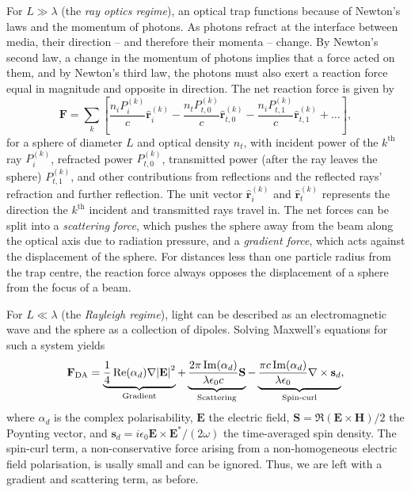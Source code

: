 \documentclass[hyperref={colorlinks=true, urlcolor=blue, citecolor=blue, final, bound}]{sfuthesis}
\begin{document}
For $L \gg \lambda$ (the \textit{ray optics regime}), an optical trap functions because of Newton's laws and the momentum of photons. As photons refract at the interface between media, their direction -- and therefore their momenta -- change. By Newton's second law, a change in the momentum of photons implies that a force acted on them, and by Newton's third law, the photons must also exert a reaction force equal in magnitude and opposite in direction. The net reaction force is given by~\cite{Jones2015}
\begin{equation}
    \mathbf F = \sum_{k} \left[ \frac{n_iP_i^{(k)}}{c}\hat{\mathbf{r}}_i^{(k)} - \frac{n_tP_{t,0}^{(k)}}{c}\hat{\mathbf{r}}_{t,0}^{(k)} - \frac{n_iP_{t,1}^{(k)}}{c}\hat{\mathbf{r}}_{t,1}^{(k)} + \dots\right],
\end{equation}
for a sphere of diameter $L$ and optical density $n_t$, with incident power of the $k^{\mathrm{th}}$ ray $P_i^{(k)}$, refracted power $P_{t,0}^{(k)}$, transmitted power (after the ray leaves the sphere) $P_{t,1}^{(k)}$, and other contributions from reflections and the reflected rays' refraction and further reflection. The unit vector $\hat{\mathbf r}_i^{(k)}$ and $\hat{\mathbf r}_t^{(k)}$ represents the direction the $k^{\mathrm{th}}$ incident and transmitted rays travel in. The net forces can be split into a \textit{scattering force}, which pushes the sphere away from the beam along the optical axis due to radiation pressure, and a \textit{gradient force}, which acts against the displacement of the sphere. For distances less than one particle radius from the trap centre, the reaction force always opposes the displacement of a sphere from the focus of a beam. 

For $L \ll \lambda$ (the \textit{Rayleigh regime}), light can be described as an electromagnetic wave and the sphere as a collection of dipoles. Solving Maxwell's equations for such a system yields~\cite{Jones2015}
\begin{equation}
    \mathbf F_{\mathrm{DA}} = \underbrace{\frac 14 \Re(\alpha_d)\nabla \abs{\mathbf E}^2}_{\text{Gradient}} + \underbrace{\frac{2\pi\Im(\alpha_d)}{\lambda\epsilon_0c}\mathbf S}_{\text{Scattering}} - \underbrace{\frac {\pi c\Im(\alpha_d)}{\lambda\epsilon_0}\nabla\times\mathbf s_d}_{\text{Spin-curl}},
\end{equation}
where $\alpha_d$ is the complex polarisability, $\mathbf E$ the electric field, $\mathbf S = \Re(\mathbf E\times\mathbf H)/2$ the Poynting vector, and $\mathbf s_d = i\epsilon_0\mathbf E\times\mathbf E^*/(2\omega)$ the time-averaged spin density. The spin-curl term, a non-conservative force arising from a non-homogeneous electric field polarisation, is usally small and can be ignored. Thus, we are left with a gradient and scattering term, as before. 
\end{document}
